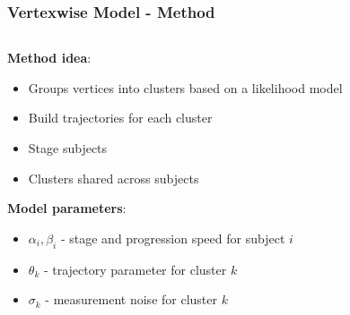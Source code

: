 \documentclass[10pt,xcolor=table]{beamer}
\begin{document}
\begin{frame}
\frametitle{Vertexwise Model - Method}

\newcommand{\lw}{0.5mm}

\newcommand{\outFolder}{.}

\begin{columns}[T]
    \hspace{0em}
    \begin{column}{0.6\textwidth}
    
    \textbf{Method idea}:
     \begin{itemize}
      \item Groups vertices into clusters based on a likelihood model
      \item Build trajectories for each cluster
      \item Stage subjects
      \item Clusters shared across subjects
     \end{itemize}
     
     \vspace{2em}
     
    \textbf{Model parameters}:
    \begin{itemize}
     \item $\alpha_i, \beta_i$ - stage and progression speed for subject $i$
     \item $\theta_k$ - trajectory parameter for cluster $k$
     \item $\sigma_k$ - measurement noise for cluster $k$
    \end{itemize}

     
    \end{column}
    \hspace{-0em}
    \begin{column}{.4\textwidth}


\end{column}
\end{columns}
\end{frame}
\end{document}
